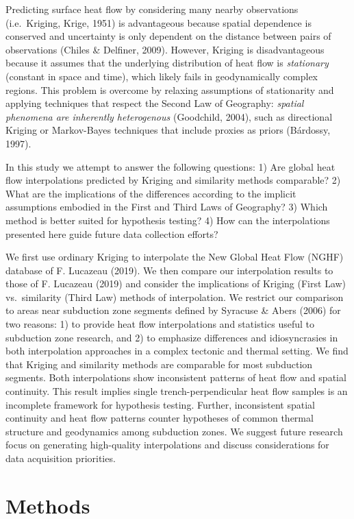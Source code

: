 \documentclass[draft,linenumbers]{agujournal2018}
\begin{document}
Predicting surface heat flow by considering many nearby observations
(i.e.~Kriging, Krige, 1951) is advantageous because spatial dependence
is conserved and uncertainty is only dependent on the distance between
pairs of observations (Chiles \& Delfiner, 2009). However, Kriging is
disadvantageous because it assumes that the underlying distribution of
heat flow is \emph{stationary} (constant in space and time), which
likely fails in geodynamically complex regions. This problem is overcome
by relaxing assumptions of stationarity and applying techniques that
respect the Second Law of Geography: \emph{spatial phenomena are
inherently heterogenous} (Goodchild, 2004), such as directional Kriging
or Markov-Bayes techniques that include proxies as priors (Bárdossy,
1997).

In this study we attempt to answer the following questions: 1) Are
global heat flow interpolations predicted by Kriging and similarity
methods comparable? 2) What are the implications of the differences
according to the implicit assumptions embodied in the First and Third
Laws of Geography? 3) Which method is better suited for hypothesis
testing? 4) How can the interpolations presented here guide future data
collection efforts?

We first use ordinary Kriging to interpolate the New Global Heat Flow
(NGHF) database of F. Lucazeau (2019). We then compare our interpolation
results to those of F. Lucazeau (2019) and consider the implications of
Kriging (First Law) vs.~similarity (Third Law) methods of interpolation.
We restrict our comparison to areas near subduction zone segments
defined by Syracuse \& Abers (2006) for two reasons: 1) to provide heat
flow interpolations and statistics useful to subduction zone research,
and 2) to emphasize differences and idiosyncrasies in both interpolation
approaches in a complex tectonic and thermal setting. We find that
Kriging and similarity methods are comparable for most subduction
segments. Both interpolations show inconsistent patterns of heat flow
and spatial continuity. This result implies single trench-perpendicular
heat flow samples is an incomplete framework for hypothesis testing.
Further, inconsistent spatial continuity and heat flow patterns counter
hypotheses of common thermal structure and geodynamics among subduction
zones. We suggest future research focus on generating high-quality
interpolations and discuss considerations for data acquisition
priorities.

\section{Methods}
\end{document}
